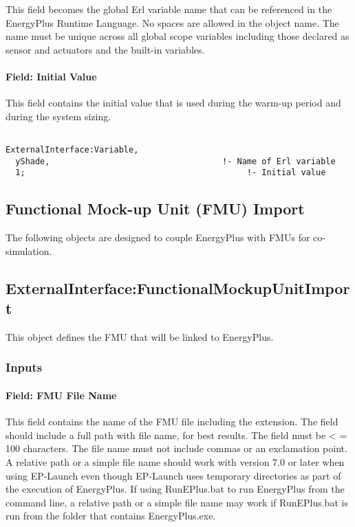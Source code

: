 This field becomes the global Erl variable name that can be referenced in the EnergyPlus Runtime Language. No spaces are allowed in the object name. The name must be unique across all global scope variables including those declared as sensor and actuators and the built-in variables.

\paragraph{Field: Initial Value}\label{field-initial-value-2}

This field contains the initial value that is used during the warm-up period and during the system sizing.

\begin{lstlisting}

ExternalInterface:Variable,
  yShade,                                   !- Name of Erl variable
  1;                                             !- Initial value
\end{lstlisting}

\subsection{Functional Mock-up Unit (FMU) Import}\label{functional-mock-up-unit-fmu-import}

The following objects are designed to couple EnergyPlus with FMUs for co-simulation.

\subsection{ExternalInterface:FunctionalMockupUnitImport}\label{externalinterfacefunctionalmockupunitimport}

This object defines the FMU that will be linked to EnergyPlus.

\subsubsection{Inputs}\label{inputs-4-012}

\paragraph{Field: FMU File Name}\label{field-fmu-file-name}

This field contains the name of the FMU file including the extension. The field should include a full path with file name, for best results. The field must be \textless{} = 100 characters. The file name must not include commas or an exclamation point. A relative path or a simple file name should work with version 7.0 or later when using EP-Launch even though EP-Launch uses temporary directories as part of the execution of EnergyPlus. If using RunEPlus.bat to run EnergyPlus from the command line, a relative path or a simple file name may work if RunEPlus.bat is run from the folder that contains EnergyPlus.exe.

